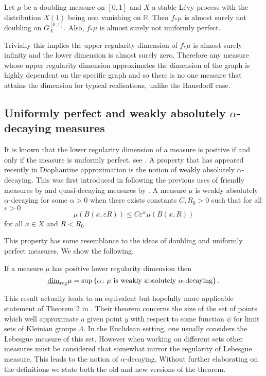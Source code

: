\begin{thm}\label{brownianthm}
	Let $\mu$ be a doubling measure on $[0,1]$ and $X$ a stable L\'evy process with the distribution $X(1)$ being non vanishing on $\mathbb{R}$. Then $f_*\mu$ is almost surely not doubling on $G_X^{[0,1]}$. Also, $f_*\mu$ is almost surely not uniformly perfect.
\end{thm}


Trivially this implies the upper regularity dimension of $f_*\mu$ is almost surely infinity and the lower dimension is almost surely zero. Therefore any measure whose upper regularity dimension approximates the dimension of the graph is highly dependent on the specific graph and so there is no one measure that attains the dimension for typical realisations, unlike the Hausdorff case. 



\subsection{Uniformly perfect and weakly absolutely $\alpha$-decaying measures}

It is known that the lower regularity dimension of a measure is positive if and only if the measure is uniformly perfect, see \cite{anti2}. A property that has appeared recently in Diophantine approximation is the notion of weakly absolutely $\alpha$-decaying. This was first introduced in \cite{beres-sanju-al} following the previous uses of friendly measures by \cite{friendly} and quasi-decaying measures by \cite{decaying1, decaying2}. A measure $\mu$ is weakly absolutely $\alpha$-decaying for some $\alpha > 0$ when there exists constants $C, R_0 >0$ such that for all $\varepsilon > 0$
\[
\mu(B(x,\varepsilon R)) \le C \varepsilon^{\alpha} \mu(B(x,R))
\]
for all $x \in X$ and $R<R_0$.

This property has some resemblance to the ideas of doubling and uniformly perfect measures. We show the following.
\begin{prop}
	If a measure $\mu$ has positive lower regularity dimension then 
	\[
	\underline{\dim}_{\textup{reg}} \mu = \sup\left\{\alpha \colon \mu \text{ is weakly absolutely $\alpha$-decaying}\right\}.
	\]
\end{prop}

This result actually leads to an equivalent but hopefully more applicable statement of Theorem 2 in \cite{beres-sanju-al}. Their theorem concerns the size of the set of points which well approximate a given point $y$ with respect to some function $\psi$ for limit sets of Kleinian groups $\Lambda$. In the Euclidean setting, one usually considers the Lebesgue measure of this set. However when working on different sets other measures must be considered that somewhat mirror the regularity of Lebesgue measure. This leads to the notion of $\alpha$-decaying. Without further elaborating on the definitions we state both the old and new versions of the theorem.

